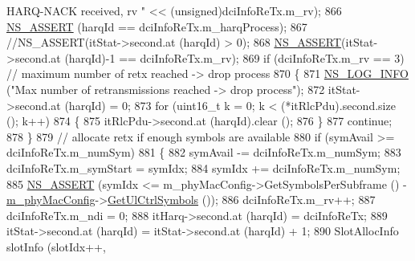 \begin{DoxyCode}
{       HARQ-NACK received, rv " << (unsigned)dciInfoReTx.m\_rv);}
866                                 \hyperlink{assert_8h_a6dccdb0de9b252f60088ce281c49d052}{NS\_ASSERT} (harqId == dciInfoReTx.m\_harqProcess);
867                                 \textcolor{comment}{//NS\_ASSERT(itStat->second.at (harqId) > 0);}
868                                 \hyperlink{assert_8h_a6dccdb0de9b252f60088ce281c49d052}{NS\_ASSERT}(itStat->second.at (harqId)-1 == dciInfoReTx.m\_rv);
869                                 \textcolor{keywordflow}{if} (dciInfoReTx.m\_rv == 3) \textcolor{comment}{// maximum number of retx reached -> drop
       process}
870                                 \{
871                                         \hyperlink{group__logging_gafbd73ee2cf9f26b319f49086d8e860fb}{NS\_LOG\_INFO} (\textcolor{stringliteral}{"Max number of retransmissions reached ->
       drop process"});
872                                         itStat->second.at (harqId) = 0;
873                                         \textcolor{keywordflow}{for} (uint16\_t k = 0; k < (*itRlcPdu).second.size (); k++)
874                                         \{
875                                                 itRlcPdu->second.at (harqId).clear ();
876                                         \}
877                                         \textcolor{keywordflow}{continue};
878                                 \}
879                                 \textcolor{comment}{// allocate retx if enough symbols are available}
880                                 \textcolor{keywordflow}{if} (symAvail >= dciInfoReTx.m\_numSym)
881                                 \{
882                                         symAvail -= dciInfoReTx.m\_numSym;
883                                         dciInfoReTx.m\_symStart = symIdx;
884                                         symIdx += dciInfoReTx.m\_numSym;
885                                         \hyperlink{assert_8h_a6dccdb0de9b252f60088ce281c49d052}{NS\_ASSERT} (symIdx <= m\_phyMacConfig->GetSymbolsPerSubframe
       () - \hyperlink{classns3_1_1MmWaveMacScheduler_a24d7af4971d2e500fe543cefbafa2fd9}{m\_phyMacConfig}->\hyperlink{classns3_1_1MmWavePhyMacCommon_aa0bf8af14050bc5dc6513fbc86319a9b}{GetUlCtrlSymbols} ());
886                                         dciInfoReTx.m\_rv++;
887                                         dciInfoReTx.m\_ndi = 0;
888                                         itHarq->second.at (harqId) = dciInfoReTx;
889                                         itStat->second.at (harqId) = itStat->second.at (harqId) + 1;
890                                         SlotAllocInfo slotInfo (slotIdx++, 

\end{DoxyCode}

